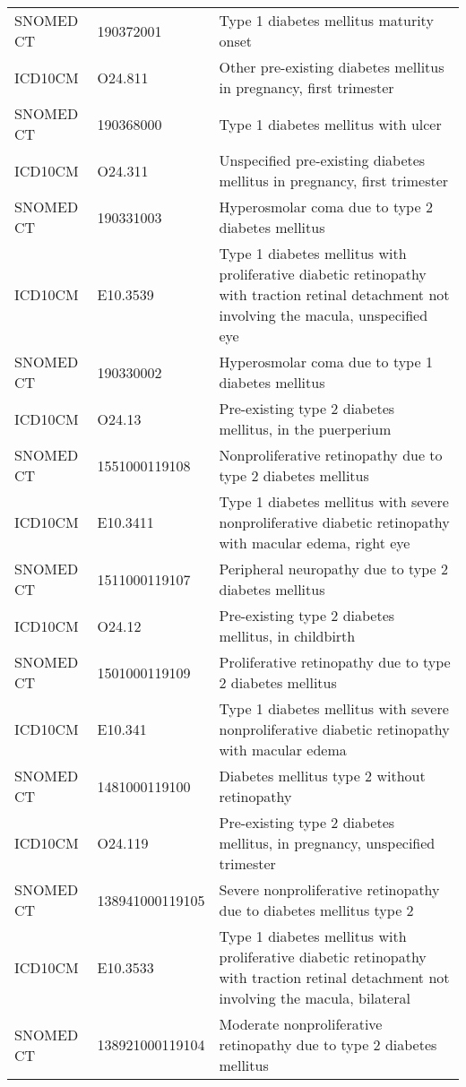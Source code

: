 \begin{table}[ht]
\begin{tabular}{lll}
  SNOMED CT & 190372001 & Type 1 diabetes mellitus maturity onset \\ 
  ICD10CM & O24.811 & Other pre-existing diabetes mellitus in pregnancy, first trimester \\ 
  SNOMED CT & 190368000 & Type 1 diabetes mellitus with ulcer \\ 
  ICD10CM & O24.311 & Unspecified pre-existing diabetes mellitus in pregnancy, first trimester \\ 
  SNOMED CT & 190331003 & Hyperosmolar coma due to type 2 diabetes mellitus \\ 
  ICD10CM & E10.3539 & Type 1 diabetes mellitus with proliferative diabetic retinopathy with traction retinal detachment not involving the macula, unspecified eye \\ 
  SNOMED CT & 190330002 & Hyperosmolar coma due to type 1 diabetes mellitus \\ 
  ICD10CM & O24.13 & Pre-existing type 2 diabetes mellitus, in the puerperium \\ 
  SNOMED CT & 1551000119108 & Nonproliferative retinopathy due to type 2 diabetes mellitus \\ 
  ICD10CM & E10.3411 & Type 1 diabetes mellitus with severe nonproliferative diabetic retinopathy with macular edema, right eye \\ 
  SNOMED CT & 1511000119107 & Peripheral neuropathy due to type 2 diabetes mellitus \\ 
  ICD10CM & O24.12 & Pre-existing type 2 diabetes mellitus, in childbirth \\ 
  SNOMED CT & 1501000119109 & Proliferative retinopathy due to type 2 diabetes mellitus \\ 
  ICD10CM & E10.341 & Type 1 diabetes mellitus with severe nonproliferative diabetic retinopathy with macular edema \\ 
  SNOMED CT & 1481000119100 & Diabetes mellitus type 2 without retinopathy \\ 
  ICD10CM & O24.119 & Pre-existing type 2 diabetes mellitus, in pregnancy, unspecified trimester \\ 
  SNOMED CT & 138941000119105 & Severe nonproliferative retinopathy due to diabetes mellitus type 2 \\ 
  ICD10CM & E10.3533 & Type 1 diabetes mellitus with proliferative diabetic retinopathy with traction retinal detachment not involving the macula, bilateral \\ 
  SNOMED CT & 138921000119104 & Moderate nonproliferative retinopathy due to type 2 diabetes mellitus \\ 

\end{tabular}
\end{table}
